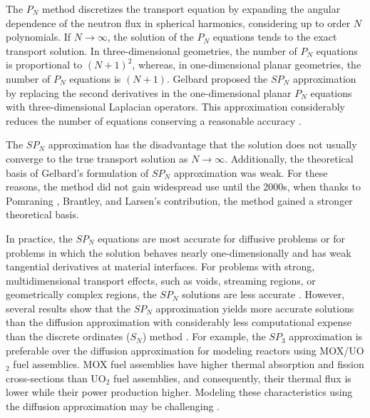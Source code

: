 \documentclass{anstrans}
\begin{document}
The $P_N$ method \cite{davidson_neutron_1957} discretizes the transport equation by expanding the angular dependence of the neutron flux in spherical harmonics, considering up to order $N$ polynomials.
If $N \rightarrow \infty$, the solution of the $P_N$ equations tends to the exact transport solution.
In three-dimensional geometries, the number of $P_N$ equations is proportional to $(N+1)^2$, whereas, in one-dimensional planar geometries, the number of $P_N$ equations is $(N+1)$.
Gelbard \cite{gelbard_spherical_1960} proposed the $SP_N$ approximation by replacing the second derivatives in the one-dimensional planar $P_N$ equations with three-dimensional Laplacian operators.
This approximation considerably reduces the number of equations conserving a reasonable accuracy \cite{capilla_applications_2009}.

The $SP_N$ approximation has the disadvantage that the solution does not usually converge to the true transport solution as $N \rightarrow \infty$.
Additionally, the theoretical basis of Gelbard's formulation of $SP_N$ approximation was weak.
For these reasons, the method did not gain widespread use until the 2000s, when thanks to Pomraning \cite{pomraning_asymptotic_1993}, Brantley, and Larsen's \cite{brantley_simplifiedP3_2000} contribution, the method gained a stronger theoretical basis.

In practice, the $SP_N$ equations are most accurate for diffusive problems or for problems in which the solution behaves nearly one-dimensionally and has weak tangential derivatives at material interfaces.
For problems with strong, multidimensional transport effects, such as voids, streaming regions, or geometrically complex regions, the $SP_N$ solutions are less accurate \cite{downar_parcs_2004}.
However, several results show that the $SP_N$ approximation yields more accurate solutions than the diffusion approximation \cite{mui_modified_1987} \cite{beckert_development_2007} \cite{fliscounakis_potential_2012} \cite{ryu_finite_2013} \cite{khosravi_mirzaee_reactor_2019} with considerably less computational expense than the discrete ordinates ($S_N$) method \cite{brantley_simplifiedP3_2000}.
For example, the $SP_3$ approximation is preferable over the diffusion approximation for modeling reactors using MOX/UO$_2$ fuel assemblies.
MOX fuel assemblies have higher thermal absorption and fission cross-sections than UO$_2$ fuel assemblies, and consequently, their thermal flux is lower while their power production higher.
Modeling these characteristics using the diffusion approximation may be challenging \cite{brantley_simplifiedP3_2000} \cite{capilla_applications_2009}.
\end{document}
